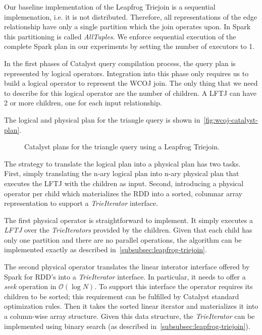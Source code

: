 Our baseline implementation of the Leapfrog Triejoin is a sequential implemenation, i.e. it is not distributed.
Therefore, all representations of the edge relationship have only a single partition which the join operates upon.
In Spark this partitioning is called \textit{AllTuples}.
We enforce sequential execution of the complete Spark plan in our experiments by setting the number of executors to 1.

In the first phases of Catalyst query compilation process, the query plan is represented by logical operators.
Integration into this phase only requires us to build a logical operator to represent the \textsc{WCOJ} join.
The only thing that we need to describe for this logical operator are the number of children.
A \textsc{LFTJ} can have 2 or more children, one for each input relationship.

The logical and physical plan for the triangle query is shown in~\cref{fig:wcoj-catalyst-plan}.

\begin{figure}
    \caption{Catalyst plans for the triangle query using a Leapfrog Triejoin.}
    \label{fig:lftj-catalyst-plan}
\end{figure}

The strategy to translate the logical plan into a physical plan has two tasks.
First, simply translating the n-ary logical plan into n-ary physical plan that executes the \textsc{LFTJ} with the children as input.
Second, introducing a physical operator per child which materializes the RDD into a sorted, columnar array representation to support a
\textit{TrieIterator} interface.

The first physical operator is straightforward to implement.
It simply executes a \textit{LFTJ} over the \textit{TrieIterators} provided by the children.
Given that each child has only one partition and there are no parallel operations, the algorithm can be implemented exactly
as described in~\cref{subsubsec:leapfrog-triejoin}.

The second physical operator translates the linear interator interface offered by Spark for RDD's into a \textit{TrieIterator} interface.
In particular, it needs to offer a \textit{seek} operation in $\mathcal{O} (\log N) $.
To support this interface the operator requires its children to be sorted;
this requirement can be fulfilled by Catalyst standard optimization rules.
Then it takes the sorted linear iterator and materializes it into a column-wise array structure.
Given this data structure, the \textit{TrieIterator} can be implemented using binary search (as described
in~\cref{subsubsec:leapfrog-triejoin}).

